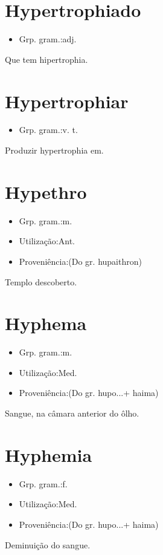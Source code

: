 \documentclass{article}
\begin{document}
\section{Hypertrophiado}
\begin{itemize}
\item {Grp. gram.:adj.}
\end{itemize}
Que tem hipertrophia.
\section{Hypertrophiar}
\begin{itemize}
\item {Grp. gram.:v. t.}
\end{itemize}
Produzir hypertrophia em.
\section{Hypethro}
\begin{itemize}
\item {Grp. gram.:m.}
\end{itemize}
\begin{itemize}
\item {Utilização:Ant.}
\end{itemize}
\begin{itemize}
\item {Proveniência:(Do gr. \textunderscore hupaithron\textunderscore )}
\end{itemize}
Templo descoberto.
\section{Hyphema}
\begin{itemize}
\item {Grp. gram.:m.}
\end{itemize}
\begin{itemize}
\item {Utilização:Med.}
\end{itemize}
\begin{itemize}
\item {Proveniência:(Do gr. \textunderscore hupo...\textunderscore  + \textunderscore haima\textunderscore )}
\end{itemize}
Sangue, na câmara anterior do ôlho.
\section{Hyphemia}
\begin{itemize}
\item {Grp. gram.:f.}
\end{itemize}
\begin{itemize}
\item {Utilização:Med.}
\end{itemize}
\begin{itemize}
\item {Proveniência:(Do gr. \textunderscore hupo...\textunderscore  + \textunderscore haima\textunderscore )}
\end{itemize}
Deminuição do sangue.
\end{document}
